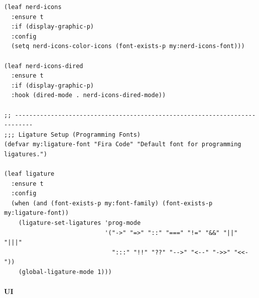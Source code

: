 \documentclass[11pt]{article}
\begin{document}
\begin{verbatim}
(leaf nerd-icons
  :ensure t
  :if (display-graphic-p)
  :config
  (setq nerd-icons-color-icons (font-exists-p my:nerd-icons-font)))

(leaf nerd-icons-dired
  :ensure t
  :if (display-graphic-p)
  :hook (dired-mode . nerd-icons-dired-mode))

;; ---------------------------------------------------------------------------
;;; Ligature Setup (Programming Fonts)
(defvar my:ligature-font "Fira Code" "Default font for programming ligatures.")

(leaf ligature
  :ensure t
  :config
  (when (and (font-exists-p my:font-family) (font-exists-p my:ligature-font))
    (ligature-set-ligatures 'prog-mode
                            '("->" "=>" "::" "===" "!=" "&&" "||" "|||"
                              ":::" "!!" "??" "-->" "<--" "->>" "<<-"))
    (global-ligature-mode 1)))
\end{verbatim}
\paragraph{UI}
\label{sec:org10e59ee}
\end{document}
